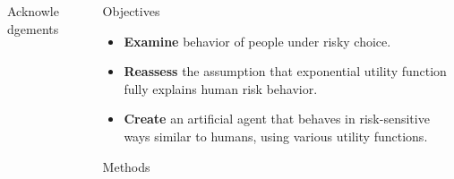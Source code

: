 \documentclass[final]{beamer}
\newlength{\sepwid}
\newlength{\onecolwid}
\begin{document}
\begin{frame}
\begin{columns}[t]
\begin{column}{\onecolwid}
\begin{block}{Acknowledgements}
\end{block}


\end{column} %

\begin{column}{\sepwid}\end{column} %

\begin{column}{\onecolwid} %


\begin{exampleblock}{Objectives}

\begin{itemize}
\item \textbf{Examine} behavior of people under risky choice.
\item \textbf{Reassess} the assumption that exponential utility function fully explains human risk behavior.
\item \textbf{Create} an artificial agent that behaves in risk-sensitive ways similar to humans, using various utility functions.
\end{itemize}

\end{exampleblock}


\begin{exampleblock}{Methods}



\end{exampleblock}

\end{column} %




\end{columns}
\end{frame}
\end{document}
